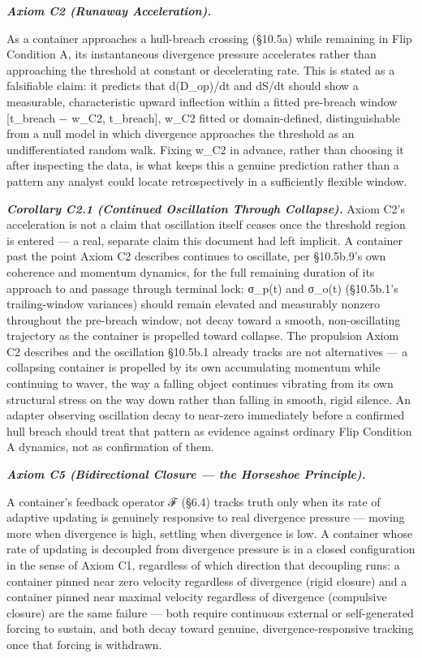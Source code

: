 \documentclass[
]{article}
\begin{document}
\emph{\textbf{Axiom C2 (Runaway Acceleration).}}

As a container approaches a hull-breach crossing (§10.5a) while
remaining in Flip Condition A, its instantaneous divergence pressure
accelerates rather than approaching the threshold at constant or
decelerating rate. This is stated as a falsifiable claim: it predicts
that d(D\_op)/dt and dS/dt should show a measurable, characteristic
upward inflection within a fitted pre-breach window {[}t\_breach −
w\_C2, t\_breach{]}, w\_C2 fitted or domain-defined, distinguishable
from a null model in which divergence approaches the threshold as an
undifferentiated random walk. Fixing w\_C2 in advance, rather than
choosing it after inspecting the data, is what keeps this a genuine
prediction rather than a pattern any analyst could locate
retrospectively in a sufficiently flexible window.

\emph{\textbf{Corollary C2.1 (Continued Oscillation Through Collapse).}}
Axiom C2's acceleration is not a claim that oscillation itself ceases
once the threshold region is entered --- a real, separate claim this
document had left implicit. A container past the point Axiom C2
describes continues to oscillate, per §10.5b.9's own coherence and
momentum dynamics, for the full remaining duration of its approach to
and passage through terminal lock: σ\_p(t) and σ\_o(t) (§10.5b.1's
trailing-window variances) should remain elevated and measurably nonzero
throughout the pre-breach window, not decay toward a smooth,
non-oscillating trajectory as the container is propelled toward
collapse. The propulsion Axiom C2 describes and the oscillation §10.5b.1
already tracks are not alternatives --- a collapsing container is
propelled by its own accumulating momentum while continuing to waver,
the way a falling object continues vibrating from its own structural
stress on the way down rather than falling in smooth, rigid silence. An
adapter observing oscillation decay to near-zero immediately before a
confirmed hull breach should treat that pattern as evidence against
ordinary Flip Condition A dynamics, not as confirmation of them.

\emph{\textbf{Axiom C5 (Bidirectional Closure --- the Horseshoe
Principle).}}

A container's feedback operator ℱ (§6.4) tracks truth only when its rate
of adaptive updating is genuinely responsive to real divergence pressure
--- moving more when divergence is high, settling when divergence is
low. A container whose rate of updating is decoupled from divergence
pressure is in a closed configuration in the sense of Axiom C1,
regardless of which direction that decoupling runs: a container pinned
near zero velocity regardless of divergence (rigid closure) and a
container pinned near maximal velocity regardless of divergence
(compulsive closure) are the same failure --- both require continuous
external or self-generated forcing to sustain, and both decay toward
genuine, divergence-responsive tracking once that forcing is withdrawn.
\end{document}
